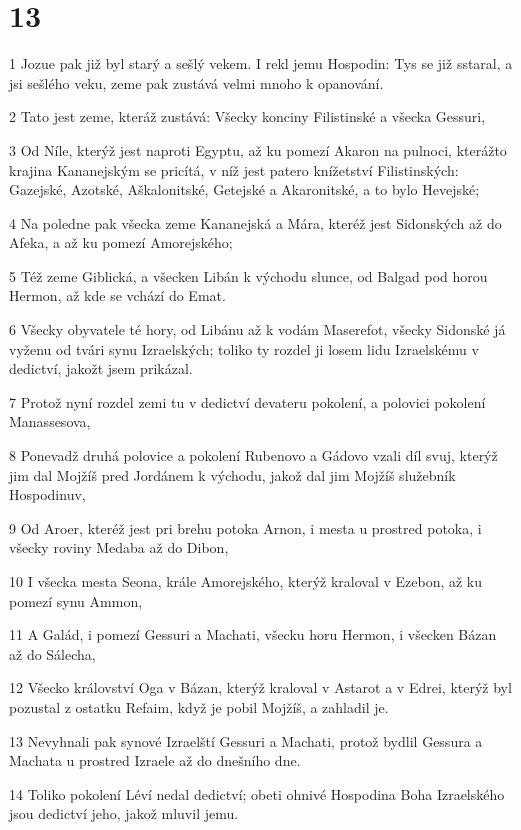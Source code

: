 \chapter{13}

\par 1 Jozue pak již byl starý a sešlý vekem. I rekl jemu Hospodin: Tys se již sstaral, a jsi sešlého veku, zeme pak zustává velmi mnoho k opanování.
\par 2 Tato jest zeme, kteráž zustává: Všecky konciny Filistinské a všecka Gessuri,
\par 3 Od Níle, kterýž jest naproti Egyptu, až ku pomezí Akaron na pulnoci, kterážto krajina Kananejským se pricítá, v níž jest patero knížetství Filistinských: Gazejské, Azotské, Aškalonitské, Getejské a Akaronitské, a to bylo Hevejské;
\par 4 Na poledne pak všecka zeme Kananejská a Mára, kteréž jest Sidonských až do Afeka, a až ku pomezí Amorejského;
\par 5 Též zeme Giblická, a všecken Libán k východu slunce, od Balgad pod horou Hermon, až kde se vchází do Emat.
\par 6 Všecky obyvatele té hory, od Libánu až k vodám Maserefot, všecky Sidonské já vyženu od tvári synu Izraelských; toliko ty rozdel ji losem lidu Izraelskému v dedictví, jakožt jsem prikázal.
\par 7 Protož nyní rozdel zemi tu v dedictví devateru pokolení, a polovici pokolení Manassesova,
\par 8 Ponevadž druhá polovice a pokolení Rubenovo a Gádovo vzali díl svuj, kterýž jim dal Mojžíš pred Jordánem k východu, jakož dal jim Mojžíš služebník Hospodinuv,
\par 9 Od Aroer, kteréž jest pri brehu potoka Arnon, i mesta u prostred potoka, i všecky roviny Medaba až do Dibon,
\par 10 I všecka mesta Seona, krále Amorejského, kterýž kraloval v Ezebon, až ku pomezí synu Ammon,
\par 11 A Galád, i pomezí Gessuri a Machati, všecku horu Hermon, i všecken Bázan až do Sálecha,
\par 12 Všecko království Oga v Bázan, kterýž kraloval v Astarot a v Edrei, kterýž byl pozustal z ostatku Refaim, když je pobil Mojžíš, a zahladil je.
\par 13 Nevyhnali pak synové Izraelští Gessuri a Machati, protož bydlil Gessura a Machata u prostred Izraele až do dnešního dne.
\par 14 Toliko pokolení Léví nedal dedictví; obeti ohnivé Hospodina Boha Izraelského jsou dedictví jeho, jakož mluvil jemu.
